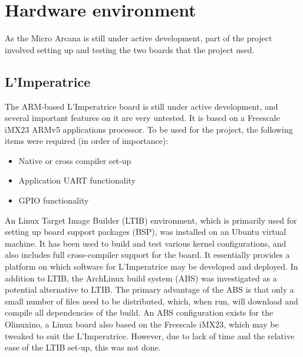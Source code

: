 

\section{Hardware environment} %
\label{sec:hardware_dev_env}
	As the Micro Arcana is still under active development, part of the project involved setting up and testing the two boards that the project used.

	\subsection{L'Imperatrice} %
	\label{sub:l_imperatrice_env}
		The ARM-based L'Imperatrice board is still under active development, and several important features on it are very untested.  It is based on a Freescale iMX23 ARMv5 applications processor.  To be used for the project, the following items were required (in order of importance):
		\begin{itemize}
			\item Native or cross compiler set-up
			\item Application UART functionality
			\item GPIO functionality
		\end{itemize}

		An Linux Target Image Builder (LTIB)  environment, which is primarily used for setting up board support packages (BSP), was installed on an Ubuntu virtual machine.  It has been used to build and test various kernel configurations, and also includes full cross-compiler support for the board.  It essentially provides a platform on which software for L'Imperatrice may be developed and deployed.
		In addition to LTIB, the ArchLinux build system (ABS) was investigated as a potential alternative to LTIB.  The primary advantage of the ABS is that only a small number of files need to be distributed, which, when run, will download and compile all dependencies of the build.  An ABS configuration exists for the Olinuxino, a Linux board also based on the Freescale iMX23, which may be tweaked to suit the L'Imperatrice.  However, due to lack of time and the relative ease of the LTIB set-up, this was not done.


